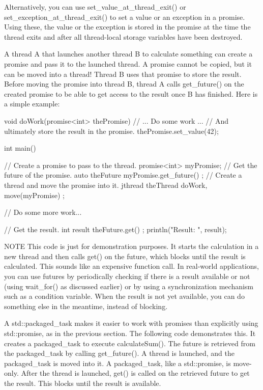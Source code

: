 Alternatively, you can use set\_value\_at\_thread\_exit() or set\_exception\_at\_thread\_exit() to set a value or an exception in a promise. Using these, the value or the exception is stored in the promise at the time the thread exits and after all thread-local storage variables have been destroyed.

A thread A that launches another thread B to calculate something can create a promise and pass it to the launched thread. A promise cannot be copied, but it can be moved into a thread! Thread B uses that promise to store the result. Before moving the promise into thread B, thread A calls get\_future() on the created promise to be able to get access to the result once B has finished. Here is a simple example:

\begin{cpp}
void doWork(promise<int> thePromise)
{
    // ... Do some work ...
    // And ultimately store the result in the promise.
    thePromise.set_value(42);
}

int main()
{
    // Create a promise to pass to the thread.
    promise<int> myPromise;
    // Get the future of the promise.
    auto theFuture { myPromise.get_future() };
    // Create a thread and move the promise into it.
    jthread theThread { doWork, move(myPromise) };

    // Do some more work...

    // Get the result.
    int result { theFuture.get() };
    println("Result: {}", result);
}
\end{cpp}

\begin{myNotic}{NOTE}
This code is just for demonstration purposes. It starts the calculation in a new thread and then calls get() on the future, which blocks until the result is calculated. This sounds like an expensive function call. In real-world applications, you can use futures by periodically checking if there is a result available or not (using wait\_for() as discussed earlier) or by using a synchronization mechanism such as a condition variable. When the result is not yet available, you can do something else in the meantime, instead of blocking.
\end{myNotic}


A std::packaged\_task makes it easier to work with promises than explicitly using std::promise, as in the previous section. The following code demonstrates this. It creates a packaged\_task to execute calculateSum(). The future is retrieved from the packaged\_task by calling get\_future(). A thread is launched, and the packaged\_task is moved into it. A packaged\_task, like a std::promise, is move-only. After the thread is launched, get() is called on the retrieved future to get the result. This blocks until the result is available.

